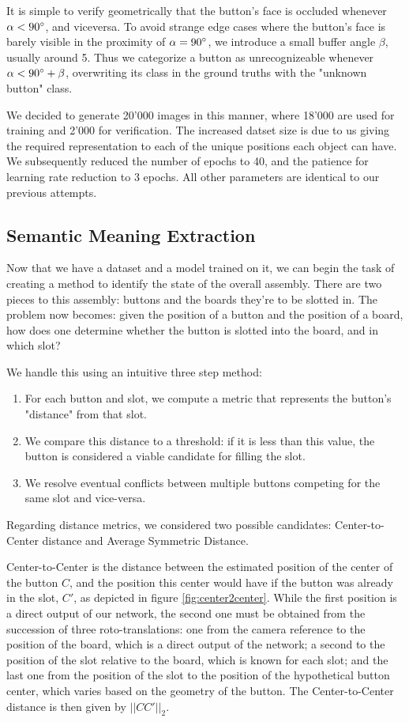 It is simple to verify geometrically that the button's face is occluded whenever $\alpha < 90\degree$, and viceversa. To avoid strange edge cases where the button's face is barely visible in the proximity of $\alpha = 90\degree$, we introduce a small buffer angle $\beta$, usually around 5\degree. Thus we categorize a button as unrecognizeable whenever $\alpha < 90\degree + \beta$, overwriting its class in the ground truths with the "unknown button" class.

We decided to generate 20'000 images in this manner, where 18'000 are used for training and 2'000 for verification. The increased datset size is due to us giving the required representation to each of the unique positions each object can have. We subsequently reduced the number of epochs to 40, and the patience for learning rate reduction to 3 epochs. All other parameters are identical to our previous attempts.

\subsection{Semantic Meaning Extraction}

Now that we have a dataset and a model trained on it, we can begin the task of creating a method to identify the state of the overall assembly. There are two pieces to this assembly: buttons and the boards they're to be slotted in. The problem now becomes: given the position of a button and the position of a board, how does one determine whether the button is slotted into the board, and in which slot?

We handle this using an intuitive three step method:
\begin{enumerate}
    \item For each button and slot, we compute a metric that represents the button's "distance" from that slot.
    \item We compare this distance to a threshold: if it is less than this value, the button is considered a viable candidate for filling the slot.
    \item We resolve eventual conflicts between multiple buttons competing for the same slot and vice-versa.
\end{enumerate}

Regarding distance metrics, we considered two possible candidates: Center-to-Center distance and Average Symmetric Distance.

Center-to-Center is the distance between the estimated position of the center of the button $C$, and the position this center would have if the button was already in the slot, $C'$, as depicted in figure \ref{fig:center2center}. While the first position is a direct output of our network, the second one must be obtained from the succession of three roto-translations: one from the camera reference to the position of the board, which is a direct output of the network; a second to the position of the slot relative to the board, which is known for each slot; and the last one from the position of the slot to the position of the hypothetical button center, which varies based on the geometry of the button. The Center-to-Center distance is then given by $||CC'||_2$.

